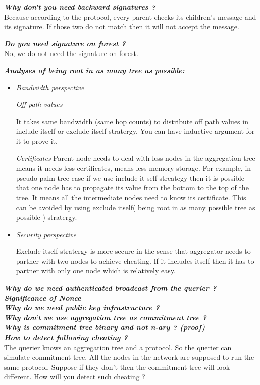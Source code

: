 \textbf{\textit{Why don't you need backward signatures ?}}\\ Because according to the protocol, every parent checks its children's message and its signature. If those two do not match then it will not accept the message.

\textbf{\textit{Do you need signature on forest ?}}\\No, we do not need the signature on forest.

\textbf{\textit{Analyses of being root in as many tree as possible:}}
	
	\begin{itemize}
		\item \textit{Bandwidth perspective}
	
			\textit{Off path values}
				
				It takes same bandwidth (same hop counts) to distribute off path values in include itself or exclude itself stratergy. You can have inductive argument for it to prove it.

			\textit{Certificates}
				Parent node needs to deal with less nodes in the aggregation tree means it needs less certificates, means less memory storage. For example, in pseudo palm tree case if we use include it self streategy then it is possible that one node has to propagate its value from the bottom to the top of the tree. It means all the intermediate nodes need to know its certificate. This can be avoided by using exclude itself( being root in as many possible tree as possible ) stratergy.

		\item \textit{Security perspective}

				Exclude itself stratergy is more secure in the sense that aggregator needs to partner with two nodes to achieve cheating. If it includes itself then it has to partner with only one node which is relatively easy.

	\end{itemize}

\textbf{\textit{Why do we need authenticated broadcast from the querier ?}}\\

\textbf{\textit{Significance of Nonce}}\\

\textbf{\textit{Why do we need public key infrastructure ?}}\\

\textbf{\textit{Why don't we use aggregation tree as commitment tree ?}}\\

\textbf{\textit{Why is commitment tree binary and not n-ary ? (proof)}}\\

\textbf{\textit{How to detect following cheating ?}}\\
	The querier knows an aggregation tree and a protocol. So the querier can simulate commitment tree.
	All the nodes in the network are supposed to run the same protocol. Suppose if they don't then the commitment tree will look different. How will you detect such cheating ?

\newpage